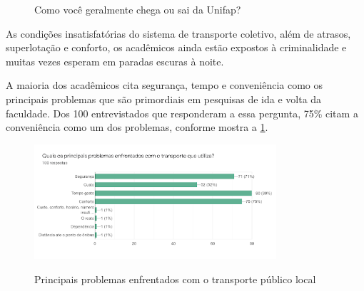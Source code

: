 \begin{figure}[H]
	
	\center
	\qquad
	\caption{Como você geralmente chega ou sai da Unifap?}
	
\end{figure}


As condições insatisfatórias do sistema de transporte coletivo, além de atrasos, superlotação e conforto, os acadêmicos ainda estão expostos à criminalidade e muitas vezes esperam em paradas escuras à noite.

A maioria dos acadêmicos cita segurança, tempo e conveniência como os principais problemas que são primordiais em pesquisas de ida e volta da faculdade. Dos 100 entrevistados que responderam a essa pergunta, 75\% citam a conveniência como um dos problemas, conforme mostra a \ref{fig:problemasenfrentadosparair}.

\begin{figure}[H]
	\centering
	\caption{Principais problemas enfrentados com o transporte público local}
	\includegraphics[width=0.8\textwidth]{./04-figuras/questionario/11.png}
	\label{fig:problemasenfrentadosparair}
\end{figure}


